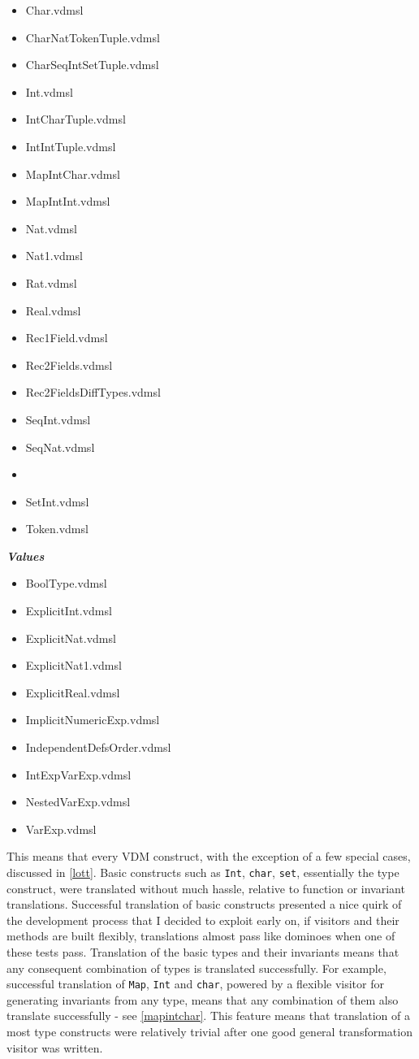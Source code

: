 \begin{multicols}{2}
\begin{itemize}
\item Char.vdmsl
\item CharNatTokenTuple.vdmsl
\item CharSeqIntSetTuple.vdmsl
\item Int.vdmsl
\item IntCharTuple.vdmsl
\item IntIntTuple.vdmsl
\item MapIntChar.vdmsl
\item MapIntInt.vdmsl
\item Nat.vdmsl
\item Nat1.vdmsl
\item Rat.vdmsl
\item Real.vdmsl
\item Rec1Field.vdmsl
\item Rec2Fields.vdmsl
\item Rec2FieldsDiffTypes.vdmsl
\item SeqInt.vdmsl
\item SeqNat.vdmsl
\item \item SetInt.vdmsl
\item Token.vdmsl
\end{itemize}
\textbf{\emph{Values}}
\begin{itemize}
\item BoolType.vdmsl
\item ExplicitInt.vdmsl
\item ExplicitNat.vdmsl
\item ExplicitNat1.vdmsl
\item ExplicitReal.vdmsl
\item ImplicitNumericExp.vdmsl
\item IndependentDefsOrder.vdmsl
\item IntExpVarExp.vdmsl
\item NestedVarExp.vdmsl
\item VarExp.vdmsl
\end{itemize}
\end{multicols}
This means that every VDM construct, with the exception of a few special cases, discussed in \ref{lott}. Basic constructs such as \lstinline[language=Isabelle]{Int}, \lstinline[language=Isabelle]{char}, \lstinline[language=Isabelle]{set}, essentially the type construct, were translated without much hassle, relative to function or invariant translations. Successful translation of basic constructs presented a nice quirk of the development process that I decided to exploit early on, if visitors and their methods are built flexibly, translations almost pass like dominoes when one of these tests pass. Translation of the basic types and their invariants means that any consequent combination of types is translated successfully. For example, successful translation of \lstinline[language=Isabelle]{Map}, \lstinline[language=Isabelle]{Int} and \lstinline[language=Isabelle]{char}, powered by a flexible visitor for generating invariants from any type, means that any combination of them also translate successfully - see \ref{mapintchar}. This feature means that translation of a most type constructs were relatively trivial after one good general transformation visitor was written. 

